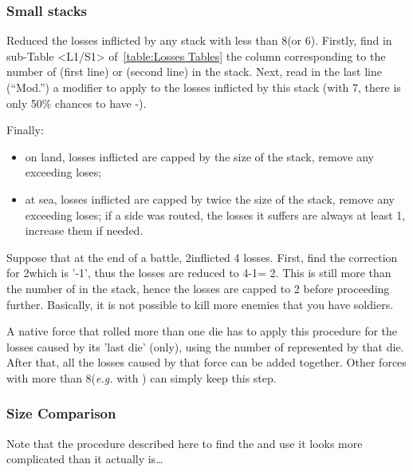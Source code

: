 
\subsubsection{Small stacks}
Reduced the losses inflicted by any stack with less than 8\LD (or
6\ND). Firstly, find in sub-Table <L1/S1> of~\ref{table:Losses Tables} the
column corresponding to the number of \ND (first line) or \LD (second line) in
the stack. Next, read in the last line (``Mod.'') a modifier to apply to the
losses inflicted by this stack (with 7\LD, there is only 50\% chances to have
-\texttu).

Finally:
\begin{itemize}
\item on land, losses inflicted are capped by the size of the stack, remove
  any exceeding loses;
\item at sea, losses inflicted are capped by twice the size of the stack,
  remove any exceeding loses; if a side was routed, the losses it suffers are
  always at least 1\ND, increase them if needed.
\end{itemize}

\begin{exemple}
  Suppose that at the end of a battle, 2\LD inflicted 4 losses. First, find
  the correction for 2\LD which is '-1\texttu', thus the losses are reduced to
  4-1\texttu = 2\texttd. This is still more than the number of \LD in the
  stack, hence the losses are capped to 2 before proceeding
  further. Basically, it is not possible to kill more enemies that you have
  soldiers.
\end{exemple}

A native force that rolled more than one die has to apply this procedure for
the losses caused by its 'last die' (only), using the number of \LD
represented by that die. After that, all the losses caused by that force can
be added together. Other forces with more than 8\LD (\emph{e.g.} \TUR with
\Pashas) can simply keep this step.

\subsubsection{Size Comparison}
Note that the procedure described here to find the 
and use it looks more complicated than it actually is\ldots



